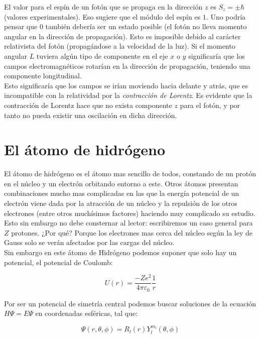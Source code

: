 \documentclass[12pt,a4paper]{article}
\numberwithin{equation}{section}
\numberwithin{figure}{section}
\begin{document}
El valor para el espín de un fotón que se propaga en la dirección $z$ es $S_z = \pm \hbar$ (valores experimentales). Eso sugiere que el módulo del espín es $1$. Uno podría pensar que $0$ también debería ser un estado posible (el fotón no lleva momento angular en la dirección de propagación). Esto es imposible debido al carácter relativista del fotón (propagándose a la velocidad de la luz). Si el momento angular $L$ tuviera algún tipo de componente en el eje $x$ o $y$ significaría que los campos electromagnéticos rotarían en la dirección de propagación, teniendo una componente longitudinal. \\

Esto significaría que los campos se irían moviendo hacia delante y atrás, que es incompatible con la relatividad por la \textit{contracción de Lorentz}. Es evidente que la contracción de Lorentz hace que no exista componente $z$ para el fotón, y por tanto no pueda existir una oscilación en dicha dirección. 


\section{El átomo de hidrógeno}

El átomo de hidrógeno es el átomo mas sencillo de todos, constando de un protón en el núcleo y un electrón orbitando entorno a este. Otros átomos presentan combinaciones mucho mas complicadas en las que la energía potencial de un electrón viene dada por la atracción de un núcleo y la repulsión de los otros electrones (entre otros muchísimos factores) haciendo muy complicado su estudio. Esto sin embargo no debe consternar al lector: escribiremos un caso general para $Z$ protones. ¿Por qué? Porque los electrones mas cerca del núcleo según la ley de Gauss solo se verán afectados por las cargas del núcleo. \\

Sin embargo en este átomo de Hidrógeno podemos suponer que solo hay un potencial, el potencial de Coulomb:

\begin{equation}
U(r) = \dfrac{- Z e^2}{4 \pi \varepsilon_0} \dfrac{1}{r}
\end{equation}

Por ser un potencial de simetría central podemos buscar soluciones de la ecuación $H \Psi = E \Psi$  en coordenadas esféricas, tal que:

\begin{equation}
\Psi (r, \theta, \phi ) = R_l(r) Y_l^{m_l} (\theta, \phi)
\end{equation}
\end{document}
